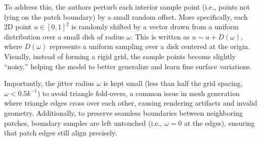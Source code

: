To address this, the authors perturb each interior sample point (i.e., points not lying on the patch boundary) by a small random offset.  
More specifically, each 2D point $u \in [0,1]^2$ is randomly shifted by a vector drawn from a uniform distribution over a small disk of radius $\omega$.  
This is written as $u \sim u + D(\omega)$, where $D(\omega)$ represents a uniform sampling over a disk centered at the origin.  
Visually, instead of forming a rigid grid, the sample points become slightly ``noisy,'' helping the model to better generalize and learn fine surface variations.  

Importantly, the jitter radius $\omega$ is kept small (less than half the grid spacing, $\omega < 0.5k^{-1}$) to avoid triangle fold-overs, a common issue in mesh generation where triangle edges cross over each other, causing rendering artifacts and invalid geometry.  
Additionally, to preserve seamless boundaries between neighboring patches, boundary samples are left untouched (i.e., $\omega=0$ at the edges), ensuring that patch edges still align precisely.  

